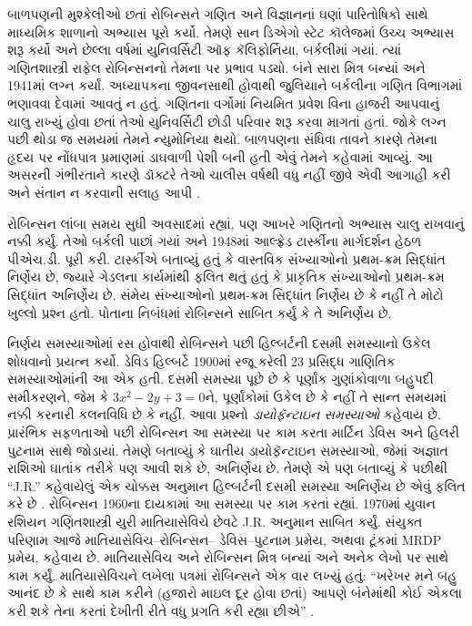 બાળપણની મુશ્કેલીઓ છતાં
રોબિન્સને ગણિત અને વિજ્ઞાનનાં
ઘણાં પારિતોષિકો સાથે માધ્યમિક
શાળાનો અભ્યાસ પૂરો કર્યો.
તેમણે સાન ડિએગો સ્ટેટ કૉલેજમાં
ઉચ્ચ અભ્યાસ શરૂ કર્યો અને
છેલ્લા વર્ષમાં યુનિવર્સિટી ઑફ
કૅલિફોર્નિયા, બર્કલીમાં ગયાં.
ત્યાં ગણિતશાસ્ત્રી રાફેલ
રોબિન્સનનો તેમના પર પ્રભાવ
પડ્યો. બંને સારા મિત્ર બન્યાં
અને 1941માં લગ્ન કર્યાં.
અધ્યાપકના જીવનસાથી હોવાથી
જુલિયાને બર્કલીના ગણિત
વિભાગમાં ભણાવવા દેવામાં
આવતું ન હતું. ગણિતના
વર્ગોમાં નિયમિત પ્રવેશ વિના
હાજરી આપવાનું ચાલુ રાખ્યું
હોવા છતાં તેઓ યુનિવર્સિટી
છોડી પરિવાર શરૂ કરવા માગતાં
હતાં. જોકે લગ્ન પછી થોડા
જ સમયમાં તેમને ન્યુમોનિયા
થયો. બાળપણના સંધિવા
તાવને કારણે તેમના હૃદય
પર નોંધપાત્ર પ્રમાણમાં
ડાઘવાળી પેશી બની હતી એવું તેમને
કહેવામાં આવ્યું. આ
અસરની ગંભીરતાને કારણે
ડૉક્ટરે તેઓ ચાલીસ વર્ષથી
વધુ નહીં જીવે એવી આગાહી
કરી અને સંતાન ન કરવાની
સલાહ આપી \citep[13]{Reid1986}.

રોબિન્સન લાંબા સમય સુધી
અવસાદમાં રહ્યાં, પણ આખરે
ગણિતનો અભ્યાસ ચાલુ રાખવાનું
નક્કી કર્યું. તેઓ બર્કલી
પાછાં ગયાં અને 1948માં
આલ્ફ્રેડ ટાર્સ્કીના માર્ગદર્શન
હેઠળ પીએચ.ડી. પૂરી કરી.
ટાર્સ્કીએ બતાવ્યું હતું કે
વાસ્તવિક સંખ્યાઓનો પ્રથમ-ક્રમ
સિદ્ધાંત નિર્ણેય છે, જ્યારે
ગેડલના કાર્યમાંથી ફલિત થતું
હતું કે પ્રાકૃતિક સંખ્યાઓનો
પ્રથમ-ક્રમ સિદ્ધાંત અનિર્ણેય
છે. સંમેય સંખ્યાઓનો પ્રથમ-ક્રમ
સિદ્ધાંત નિર્ણેય છે કે નહીં
તે મોટો ખુલ્લો પ્રશ્ન હતો.
પોતાના નિબંધમાં
\citeyearpar{Robinson1949}
રોબિન્સને સાબિત કર્યું કે
તે અનિર્ણેય છે.

નિર્ણય સમસ્યાઓમાં રસ હોવાથી
રોબિન્સને પછી હિલ્બર્ટની
દસમી સમસ્યાનો ઉકેલ શોધવાનો
પ્રયત્ન કર્યો. ડેવિડ હિલ્બર્ટે
1900માં રજૂ કરેલી 23 પ્રસિદ્ધ
ગાણિતિક સમસ્યાઓમાંની આ
એક હતી. દસમી સમસ્યા પૂછે
છે કે પૂર્ણાંક ગુણાંકોવાળા
બહુપદી સમીકરણને, જેમ કે
$3x^2 - 2y +3 = 0$ને,
પૂર્ણાંકોમાં ઉકેલ છે કે
નહીં તે સાન્ત સમયમાં
નક્કી કરનારી કલનવિધિ
છે કે નહીં. આવા પ્રશ્નો
\emph{ડાયોફૅન્ટાઇન સમસ્યાઓ}
કહેવાય છે. પ્રારંભિક
સફળતાઓ પછી રોબિન્સન
આ સમસ્યા પર કામ કરતા
માર્ટિન ડેવિસ અને
હિલરી પુટનામ સાથે
જોડાયાં. તેમણે બતાવ્યું
કે ઘાતીય ડાયોફૅન્ટાઇન
સમસ્યાઓ, જેમાં અજ્ઞાત
રાશિઓ ઘાતાંક તરીકે પણ
આવી શકે છે, અનિર્ણેય
છે. તેમણે એ પણ
બતાવ્યું કે પછીથી
“J.R.” કહેવાયેલું
એક ચોક્કસ અનુમાન
હિલ્બર્ટની દસમી
સમસ્યા અનિર્ણેય
છે એવું ફલિત કરે
છે \citep{DavisPutnamRobinson1961}.
રોબિન્સન 1960ના
દાયકામાં આ સમસ્યા
પર કામ કરતાં રહ્યાં.
1970માં યુવાન રશિયન
ગણિતશાસ્ત્રી યુરી
માતિયાસેવિચે છેવટે
J.R. અનુમાન સાબિત
કર્યું. સંયુક્ત પરિણામ
આજે માતિયાસેવિચ--રોબિન્સન--
ડેવિસ--પુટનામ પ્રમેય,
અથવા ટૂંકમાં MRDP પ્રમેય,
કહેવાય છે. માતિયાસેવિચ
અને રોબિન્સન મિત્ર
બન્યાં અને અનેક લેખો
પર સાથે કામ કર્યું.
માતિયાસેવિચને લખેલા
પત્રમાં રોબિન્સને
એક વાર લખ્યું હતું:
“ખરેખર મને બહુ આનંદ
છે કે સાથે કામ કરીને
(હજારો માઇલ દૂર
હોવા છતાં) આપણે
બંનેમાંથી કોઈ એકલા
કરી શકે તેના કરતાં
દેખીતી રીતે વધુ
પ્રગતિ કરી રહ્યા છીએ”
\citep[45]{Matijasevich1992}.

